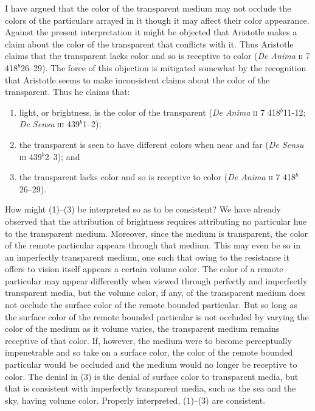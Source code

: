 I have argued that the color of the transparent medium may not occlude the colors of the particulars arrayed in it though it may affect their color appearance. Against the present interpretation it might be objected that Aristotle makes a claim about the color of the transparent that conflicts with it. Thus Aristotle claims that the transparent lacks color and so is receptive to color (\emph{De Anima} \textsc{ii} 7 418\( ^{b} \)26--29). The force of this objection is mitigated somewhat by the recognition that Aristotle seems to make inconsistent claims about the color of the transparent. Thus he claims that:
\begin{enumerate}[(1)]
	\item light, or brightness, is the color of the transparent (\emph{De Anima} \textsc{ii} 7 418\( ^{b} \)11-12; \emph{De Sensu} \textsc{iii} 439\( ^{b} \)1--2);
	\item the transparent is seen to have different colors when near and far (\emph{De Sensu} \textsc{iii} 439\( ^{b} \)2--3); and
	\item the transparent lacks color and so is receptive to color (\emph{De Anima} \textsc{ii} 7 418\( ^{b} \)26--29).
\end{enumerate}
How might (1)--(3) be interpreted so as to be consistent? We have already observed that the attribution of brightness requires attributing no particular hue to the transparent medium. Moreover, since the medium is transparent, the color of the remote particular appears through that medium. This may even be so in an imperfectly transparent medium, one such that owing to the resistance it offers to vision itself appears a certain volume color. The color of a remote particular may appear differently when viewed through perfectly and imperfectly transparent media, but the volume color, if any, of the transparent medium does not occlude the surface color of the remote bounded particular. But so long as the surface color of the remote bounded particular is not occluded by varying the color of the medium as it volume varies, the transparent medium remains receptive of that color. If, however, the medium were to become perceptually impenetrable and so take on a surface color, the color of the remote bounded particular would be occluded and the medium would no longer be receptive to color. The denial in (3) is the denial of surface color to transparent media, but that is consistent with imperfectly transparent media, such as the sea and the sky, having volume color. Properly interpreted, (1)--(3) are consistent.

